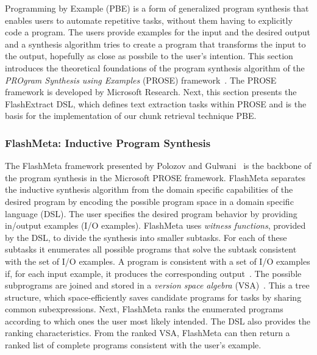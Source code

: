 Programming by Example (PBE) is a form of generalized program synthesis that enables users to automate repetitive tasks, without them having to explicitly code a program. The users provide examples for the input and the desired output and a
synthesis algorithm tries to create a program that transforms the input to the output, hopefully as close as possbile to the user's intention.
This section introduces the theoretical foundations of the program synthesis
algorithm of the \emph{PROgram Synthesis using Examples} (PROSE) framework~\cite{prose2019webpage}.
The PROSE framework is developed by Microsoft Research.
Next, this section presents the FlashExtract DSL, which defines text extraction
tasks within PROSE and is the basis for the implementation of our chunk retrieval technique PBE\@.

\subsubsection{FlashMeta: Inductive Program Synthesis}
The FlashMeta framework presented by Polozov and Gulwani~\cite{polozov2015flashmeta:} is the backbone of the program synthesis in the Microsoft PROSE framework.
FlashMeta separates the inductive synthesis algorithm from the domain specific capabilities of the desired program by encoding the possible program space in a domain specific language (DSL).
The user specifies the desired program behavior by providing in/output examples (I/O examples).
FlashMeta uses \emph{witness functions}, provided by the DSL, to divide the synthesis into smaller subtasks.
For each of these subtasks it enumerates all possible programs that solve the subtask consistent with the set of I/O examples.
A program is consistent with a set of I/O examples if, for each input example, it produces the corresponding output~\cite{mitchell1982generalization}.
The possible subprograms are joined and stored in a \emph{version space algebra} (VSA)~\cite{mitchell1982generalization}.
This a tree structure, which space-efficiently saves candidate programs for tasks by sharing common subexpressions.
Next, FlashMeta ranks the enumerated programs according to which ones the user most likely intended.
The DSL also provides the ranking characteristics.
From the ranked VSA, FlashMeta can then return a ranked list of complete programs consistent with the user's example.


